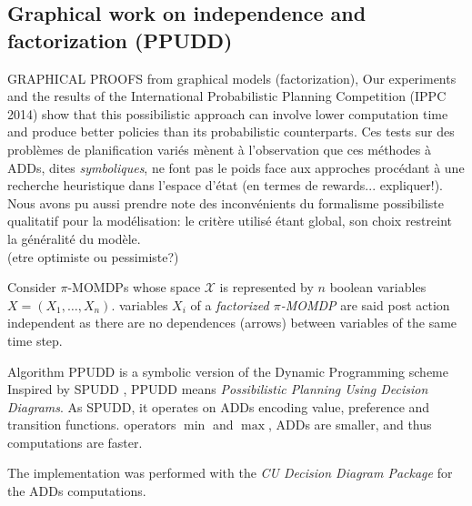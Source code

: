 \subsection*{Graphical work on independence and factorization (PPUDD)}
GRAPHICAL PROOFS from graphical models (factorization),
Our experiments and the  results 
of the International Probabilistic Planning Competition (IPPC 2014)
show that this possibilistic approach
can involve lower computation time
and produce better policies
than its probabilistic counterparts.
Ces tests sur des probl\`emes de planification vari\'es m\`enent \`a l'observation que 
ces m\'ethodes \`a ADDs, dites \textit{symboliques}, ne font pas le poids face aux
approches proc\'edant \`a une recherche heuristique dans l'espace d'\'etat \cite{DBLP:conf/aips/KellerE12} (en termes de rewards... expliquer!). 
Nous avons pu aussi prendre note des inconv\'enients du formalisme possibiliste qualitatif pour la mod\'elisation:
le crit\`ere utilis\'e \'etant global, son choix restreint la g\'en\'eralit\'e du mod\`ele.\\
(etre optimiste ou pessimiste?)

Consider $\pi$-MOMDPs 
whose space $\mathcal{X}$ is represented by
$n$ boolean variables $X=(X_1, \ldots, X_n)$.
variables $X_i$ of a \textit{factorized $\pi$-MOMDP} 
are said post action independent as there are no
dependences (arrows) between variables of the same time step.

Algorithm PPUDD is a symbolic version of 
the Dynamic Programming scheme
Inspired by SPUDD \cite{Hoey99spudd:stochastic}, 
PPUDD means \emph{Possibilistic Planning Using Decision Diagrams}. 
As SPUDD, it operates on ADDs 
encoding value, preference and transition functions.
operators $\min$ and $\max$, 
ADDs are smaller, and thus computations are faster.

The implementation was performed 
with the \textit{CU Decision Diagram Package}
for the ADDs computations. 

